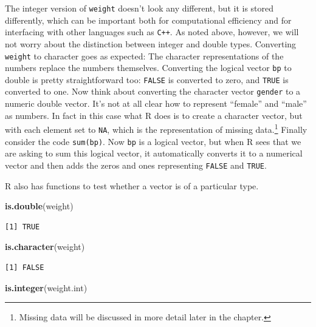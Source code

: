 \documentclass[
]{krantz}
\makeatletter
\newenvironment{Shaded}{\begin{snugshade}}{\end{snugshade}}
\newcommand{\KeywordTok}[1]{\textcolor[rgb]{0.27,0.27,0.27}{\textbf{#1}}}
\newcommand{\NormalTok}[1]{#1}
\newenvironment{kframe}{%
\medskip{}
\setlength{\fboxsep}{.8em}
 \def\at@end@of@kframe{}%
 \ifinner\ifhmode%
  \def\at@end@of@kframe{\end{minipage}}%
  \begin{minipage}{\columnwidth}%
 \fi\fi%
 \def\FrameCommand##1{\hskip\@totalleftmargin \hskip-\fboxsep
 \colorbox{shadecolor}{##1}\hskip-\fboxsep
     \hskip-\linewidth \hskip-\@totalleftmargin \hskip\columnwidth}%
 \MakeFramed {\advance\hsize-\width
   \@totalleftmargin\z@ \linewidth\hsize
   \@setminipage}}%
 {\par\unskip\endMakeFramed%
 \at@end@of@kframe}
\renewenvironment{Shaded}{\begin{kframe}}{\end{kframe}}
\makeatother
\begin{document}
The integer version of \texttt{weight} doesn't look any different, but it is stored differently, which can be important both for computational efficiency and for interfacing with other languages such as \texttt{C++}. As noted above, however, we will not worry about the distinction between integer and double types. Converting \texttt{weight} to character goes as expected: The character representations of the numbers replace the numbers themselves. Converting the logical vector \texttt{bp} to double is pretty straightforward too: \texttt{FALSE} is converted to zero, and \texttt{TRUE} is converted to one. Now think about converting the character vector \texttt{gender} to a numeric double vector. It's not at all clear how to represent ``female'' and ``male'' as numbers. In fact in this case what R does is to create a character vector, but with each element set to \texttt{NA}, which is the representation of missing data.\footnote{Missing data will be discussed in more detail later in the chapter.} Finally consider the code \texttt{sum(bp)}. Now \texttt{bp} is a logical vector, but when R sees that we are asking to sum this logical vector, it automatically converts it to a numerical vector and then adds the zeros and ones representing \texttt{FALSE} and \texttt{TRUE}.

R also has functions to test whether a vector is of a particular type.

\begin{Shaded}
\begin{Highlighting}[]
\KeywordTok{is.double}\NormalTok{(weight)}
\end{Highlighting}
\end{Shaded}

\begin{verbatim}
[1] TRUE
\end{verbatim}

\begin{Shaded}
\begin{Highlighting}[]
\KeywordTok{is.character}\NormalTok{(weight)}
\end{Highlighting}
\end{Shaded}

\begin{verbatim}
[1] FALSE
\end{verbatim}

\begin{Shaded}
\begin{Highlighting}[]
\KeywordTok{is.integer}\NormalTok{(weight.int)}
\end{Highlighting}
\end{Shaded}
\end{document}
